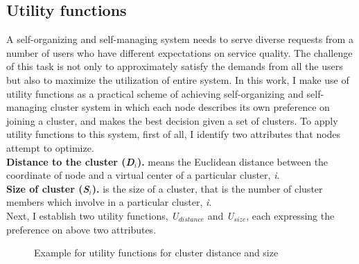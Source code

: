 \subsection{Utility functions}
\label{solare:utility}
A self-organizing and self-managing system needs to serve diverse
requests from a number of users who have different expectations on
service quality.
%
The challenge of this task is not only to approximately satisfy the
demands from all the users but also to maximize the utilization of
entire system.
%
In this work, I make use of utility functions as a practical scheme of
achieving self-organizing and self-managing cluster system in which each
node describes its own preference on joining a cluster, and makes the
best decision given a set of clusters.
%
To apply utility functions to this system, first of all, I identify two
attributes that nodes attempt to optimize.\\
%
\textbf{Distance to the cluster (\textit{D$_{i}$}).} means the Euclidean
distance between the coordinate of node and a virtual center of a
particular cluster, \textit{i}.\\
%
\textbf{Size of cluster (\textit{S$_{i}$}).} is the size of a cluster,
that is  the number of cluster members which involve in a particular
cluster, \textit{i}.\\
%
Next, I establish two utility functions, \textit{U$_{distance}$} and
\textit{U$_{size}$}, each expressing the preference on above two
attributes.
%
\begin{figure}
\centering
{}
\caption{Example for utility functions for cluster distance and size}
\label{fig:utility}
\end{figure}
